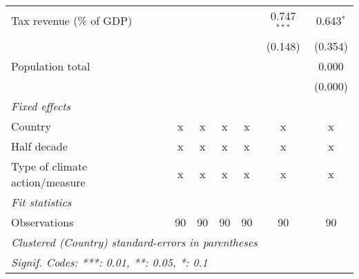 \begin{tabular}{lcccccc}
   Tax revenue (\% of GDP)                             &           &                 &                 &                 & 0.747$^{***}$    & 0.643$^{*}$\\   
                                                       &           &                 &                 &                 & (0.148)          & (0.354)\\   
   Population total                                    &           &                 &                 &                 &                  & 0.000\\   
                                                       &           &                 &                 &                 &                  & (0.000)\\   
   \emph{Fixed effects}\\
   Country                                             & x         & x               & x               & x               & x                & x\\  
   Half decade                                         & x         & x               & x               & x               & x                & x\\  
   Type of climate action/measure                      & x         & x               & x               & x               & x                & x\\  
   \midrule \emph{Fit statistics}\\
   Observations                                        & 90        & 90              & 90              & 90              & 90               & 90\\  
   \midrule
   \multicolumn{7}{l}{\emph{Clustered (Country) standard-errors in parentheses}}\\
   \multicolumn{7}{l}{\emph{Signif. Codes: ***: 0.01, **: 0.05, *: 0.1}}\\
\end{tabular}
\par\endgroup


